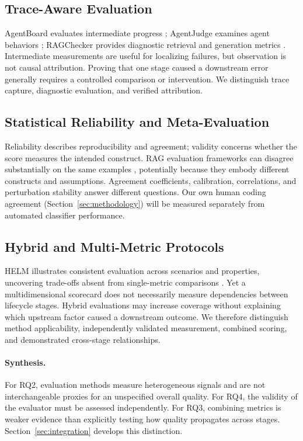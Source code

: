 \subsection{Trace-Aware Evaluation}
AgentBoard evaluates intermediate progress \cite{ma2024agentboard}; AgentJudge examines agent behaviors \cite{zhuge2025agentjudge}; RAGChecker provides diagnostic retrieval and generation metrics \cite{ru2024ragchecker}. Intermediate measurements are useful for localizing failures, but observation is not causal attribution. Proving that one stage caused a downstream error generally requires a controlled comparison or intervention. We distinguish trace capture, diagnostic evaluation, and verified attribution.

\subsection{Statistical Reliability and Meta-Evaluation}
Reliability describes reproducibility and agreement; validity concerns whether the score measures the intended construct. RAG evaluation frameworks can disagree substantially on the same examples \cite{neloy2026metarag}, potentially because they embody different constructs and assumptions. Agreement coefficients, calibration, correlations, and perturbation stability answer different questions. Our own human coding agreement (Section~\ref{sec:methodology}) will be measured separately from automated classifier performance.

\subsection{Hybrid and Multi-Metric Protocols}
HELM illustrates consistent evaluation across scenarios and properties, uncovering trade-offs absent from single-metric comparisons \cite{liang2023helm}. Yet a multidimensional scorecard does not necessarily measure dependencies between lifecycle stages. Hybrid evaluations may increase coverage without explaining which upstream factor caused a downstream outcome. We therefore distinguish method applicability, independently validated measurement, combined scoring, and demonstrated cross-stage relationships.

\paragraph{Synthesis.}
For RQ2, evaluation methods measure heterogeneous signals and are not interchangeable proxies for an unspecified overall quality. For RQ4, the validity of the evaluator must be assessed independently. For RQ3, combining metrics is weaker evidence than explicitly testing how quality propagates across stages. Section~\ref{sec:integration} develops this distinction.
